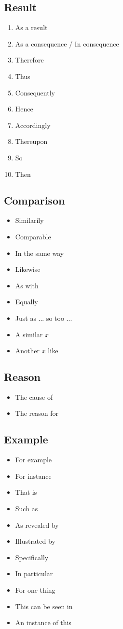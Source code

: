 \subsection{Result}
\begin{enumerate}
    \item As a result
    \item As a consequence / In consequence
    \item Therefore
    \item Thus
    \item Consequently
    \item Hence
    \item Accordingly
    \item Thereupon
    \item So
    \item Then
\end{enumerate}


\subsection{Comparison}
\begin{itemize}
    \item Similarily
    \item Comparable
    \item In the same way
    \item Likewise
    \item As with
    \item Equally
    \item Just as ... so too ...
    \item A similar $x$
    \item Another $x$ like
\end{itemize}


\subsection{Reason}
\begin{itemize}
    \item The cause of
    \item The reason for
\end{itemize}

\subsection{Example}
\begin{itemize}
    \item For example
    \item For instance
    \item That is
    \item Such as
    \item As revealed by
    \item Illustrated by
    \item Specifically
    \item In particular
    \item For one thing
    \item This can be seen in
    \item An instance of this
\end{itemize}

